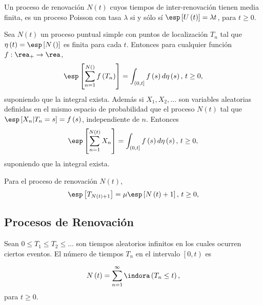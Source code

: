 \begin{Note}
Un proceso de renovaci\'on $N\left(t\right)$ cuyos tiempos de inter-renovaci\'on tienen media finita, es un proceso Poisson con tasa $\lambda$ si y s\'olo s\'i $\esp\left[U\left(t\right)\right]=\lambda t$, para $t\geq0$.
\end{Note}


\begin{Teo}
Sea $N\left(t\right)$ un proceso puntual simple con puntos de localizaci\'on $T_{n}$ tal que $\eta\left(t\right)=\esp\left[N\left(\right)\right]$ es finita para cada $t$. Entonces para cualquier funci\'on $f:\rea_{+}\rightarrow\rea$,
\begin{eqnarray*}
\esp\left[\sum_{n=1}^{N\left(\right)}f\left(T_{n}\right)\right]=\int_{\left(0,t\right]}f\left(s\right)d\eta\left(s\right)\textrm{,  }t\geq0,
\end{eqnarray*}
suponiendo que la integral exista. Adem\'as si $X_{1},X_{2},\ldots$ son variables aleatorias definidas en el mismo espacio de probabilidad que el proceso $N\left(t\right)$ tal que $\esp\left[X_{n}|T_{n}=s\right]=f\left(s\right)$, independiente de $n$. Entonces
\begin{eqnarray*}
\esp\left[\sum_{n=1}^{N\left(t\right)}X_{n}\right]=\int_{\left(0,t\right]}f\left(s\right)d\eta\left(s\right)\textrm{,  }t\geq0,
\end{eqnarray*} 
suponiendo que la integral exista. 
\end{Teo}

\begin{Coro}
Para el proceso de renovaci\'on $N\left(t\right)$,
\begin{eqnarray*}
\esp\left[T_{N\left(t\right)+1}\right]=\mu\esp\left[N\left(t\right)+1\right]\textrm{,  }t\geq0,
\end{eqnarray*}  
\end{Coro}

\subsection{Procesos de Renovaci\'on}

\begin{Def}\label{Def.Tn}
Sean $0\leq T_{1}\leq T_{2}\leq \ldots$ son tiempos aleatorios infinitos en los cuales ocurren ciertos eventos. El n\'umero de tiempos $T_{n}$ en el intervalo $\left[0,t\right)$ es

\begin{eqnarray}
N\left(t\right)=\sum_{n=1}^{\infty}\indora\left(T_{n}\leq t\right),
\end{eqnarray}
para $t\geq0$.
\end{Def}

